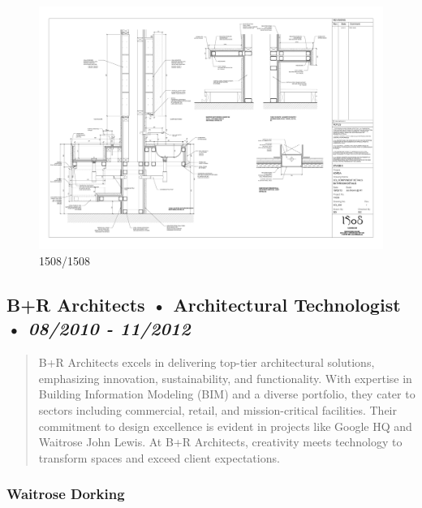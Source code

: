 \documentclass[
]{article}
\begin{document}
\begin{figure}[H]

{\centering \includegraphics{assets/1508/1508-Bathroom-Details.png}

}

\caption{1508/1508}

\end{figure}%

\subsection{\texorpdfstring{B+R Architects • Architectural Technologist
• \emph{08/2010 -
11/2012}}{B+R Architects • Architectural Technologist • 08/2010 - 11/2012}}\label{br-architects-architectural-technologist-082010---112012}

\begin{quote}
B+R Architects excels in delivering top-tier architectural solutions,
emphasizing innovation, sustainability, and functionality. With
expertise in Building Information Modeling (BIM) and a diverse
portfolio, they cater to sectors including commercial, retail, and
mission-critical facilities. Their commitment to design excellence is
evident in projects like Google HQ and Waitrose John Lewis. At B+R
Architects, creativity meets technology to transform spaces and exceed
client expectations.
\end{quote}

\subsubsection{Waitrose Dorking}\label{waitrose-dorking}
\end{document}
